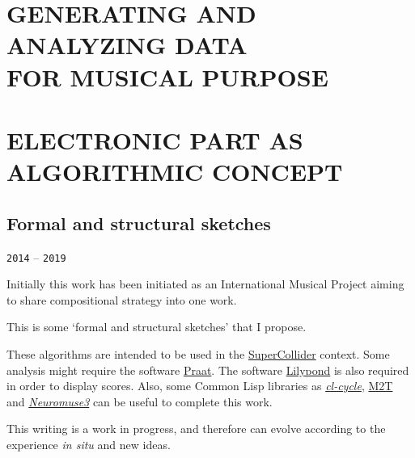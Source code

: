 \documentclass{book}
\begin{document}
\part[Generating and analyzing data for musical purpose]{GENERATING AND ANALYZING DATA\\ FOR MUSICAL PURPOSE}
\thispagestyle{empty}

\mainmatter







\part[Electronic part as algorithmic concept]{ELECTRONIC PART AS ALGORITHMIC CONCEPT}

 \chapter[Formal and structural sketches]{\huge Formal and structural sketches}
 \thispagestyle{empty}

\label{fss}
{\texttt{2014} -- \texttt{2019}}

\bigskip
\smallskip
\bigskip

Initially  this work has been initiated  as an International Musical Project aiming to share compositional strategy into one work. 

This is some `formal and structural sketches' that I propose.

\bigskip

These algorithms are intended to be used in the \href{http://supercollider.github.io}{SuperCollider} context. Some analysis might require the software \href{http://www.fon.hum.uva.nl/praat}{Praat}. The software \href{http://lilypond.org/}{Lilypond} is also required in order to display scores. Also, some Common Lisp libraries as \href{https://github.com/yannics/cl-cycle}{\textsl{cl-cycle}}, \href{https://github.com/yannics/M2T}{M2T} and \href{https://bitbucket.org/yann\_ics/neuromuse3}{\textsl{Neuromuse3}} can be useful to complete this work.

\bigskip

This writing is a work in progress, and therefore can evolve according to the experience \textit{in situ} and new ideas. 

\smallskip
\end{document}

